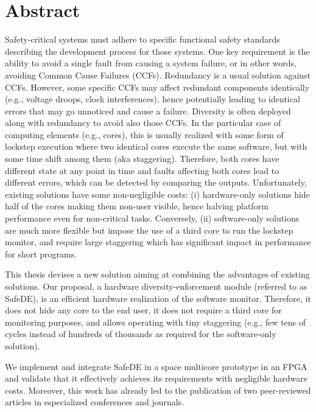 \documentclass[a4paper,12pt]{article}
\begin{document}
\newpage
\listoffigures
\lstlistoflistings
\listoftables

\newpage


\clearpage
\newpage
\section*{Abstract}

Safety-critical systems must adhere to specific functional safety standards describing the development process for those systems. One key requirement is the ability to avoid a single fault from causing a system failure, or in other words, avoiding Common Cause Failures (CCFs). Redundancy is a usual solution against CCFs. However, some specific CCFs may affect redundant components identically (e.g., voltage droops, clock interferences), hence potentially leading to identical errors that may go unnoticed and cause a failure.
Diversity is often deployed along with redundancy to avoid also those CCFs. In the particular case of computing elements (e.g., cores), this is usually realized with some form of lockstep execution where two identical cores execute the same software, but with some time shift among them (aka staggering). Therefore, both cores have different state at any point in time and faults affecting both cores lead to different errors, which can be detected by comparing the outputs.
Unfortunately, existing solutions have some non-negligible costs: (i) hardware-only solutions hide half of the cores making them non-user visible, hence halving platform performance even for non-critical tasks. Conversely, (ii) software-only solutions are much more flexible but impose the use of a third core to run the lockstep monitor, and require large staggering which has significant impact in performance for short programs.

This thesis devises a new solution aiming at combining the advantages of existing solutions. Our proposal, a hardware diversity-enforcement module (referred to as SafeDE), is an efficient hardware realization of the software monitor. Therefore, it does not hide any core to the end user, it does not require a third core for monitoring purposes, and allows operating with tiny staggering (e.g., few tens of cycles instead of hundreds of thousands as required for the software-only solution). 

We implement and integrate SafeDE in a space multicore prototype in an FPGA and validate that it effectively achieves its requirements with negligible hardware costs. Moreover, this work has already led to the publication of two peer-reviewed articles in especialized conferences and journals.
\end{document}
